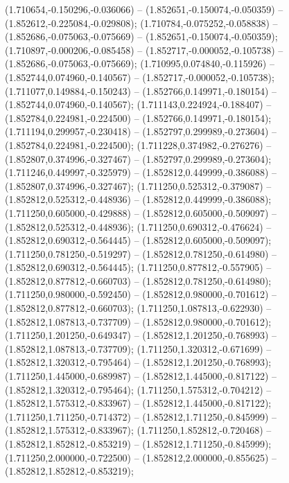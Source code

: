  (1.710654,-0.150296,-0.036066) -- (1.852651,-0.150074,-0.050359) -- (1.852612,-0.225084,-0.029808);
 (1.710784,-0.075252,-0.058838) -- (1.852686,-0.075063,-0.075669) -- (1.852651,-0.150074,-0.050359);
 (1.710897,-0.000206,-0.085458) -- (1.852717,-0.000052,-0.105738) -- (1.852686,-0.075063,-0.075669);
 (1.710995,0.074840,-0.115926) -- (1.852744,0.074960,-0.140567) -- (1.852717,-0.000052,-0.105738);
 (1.711077,0.149884,-0.150243) -- (1.852766,0.149971,-0.180154) -- (1.852744,0.074960,-0.140567);
 (1.711143,0.224924,-0.188407) -- (1.852784,0.224981,-0.224500) -- (1.852766,0.149971,-0.180154);
 (1.711194,0.299957,-0.230418) -- (1.852797,0.299989,-0.273604) -- (1.852784,0.224981,-0.224500);
 (1.711228,0.374982,-0.276276) -- (1.852807,0.374996,-0.327467) -- (1.852797,0.299989,-0.273604);
 (1.711246,0.449997,-0.325979) -- (1.852812,0.449999,-0.386088) -- (1.852807,0.374996,-0.327467);
 (1.711250,0.525312,-0.379087) -- (1.852812,0.525312,-0.448936) -- (1.852812,0.449999,-0.386088);
 (1.711250,0.605000,-0.429888) -- (1.852812,0.605000,-0.509097) -- (1.852812,0.525312,-0.448936);
 (1.711250,0.690312,-0.476624) -- (1.852812,0.690312,-0.564445) -- (1.852812,0.605000,-0.509097);
 (1.711250,0.781250,-0.519297) -- (1.852812,0.781250,-0.614980) -- (1.852812,0.690312,-0.564445);
 (1.711250,0.877812,-0.557905) -- (1.852812,0.877812,-0.660703) -- (1.852812,0.781250,-0.614980);
 (1.711250,0.980000,-0.592450) -- (1.852812,0.980000,-0.701612) -- (1.852812,0.877812,-0.660703);
 (1.711250,1.087813,-0.622930) -- (1.852812,1.087813,-0.737709) -- (1.852812,0.980000,-0.701612);
 (1.711250,1.201250,-0.649347) -- (1.852812,1.201250,-0.768993) -- (1.852812,1.087813,-0.737709);
 (1.711250,1.320312,-0.671699) -- (1.852812,1.320312,-0.795464) -- (1.852812,1.201250,-0.768993);
 (1.711250,1.445000,-0.689987) -- (1.852812,1.445000,-0.817122) -- (1.852812,1.320312,-0.795464);
 (1.711250,1.575312,-0.704212) -- (1.852812,1.575312,-0.833967) -- (1.852812,1.445000,-0.817122);
 (1.711250,1.711250,-0.714372) -- (1.852812,1.711250,-0.845999) -- (1.852812,1.575312,-0.833967);
 (1.711250,1.852812,-0.720468) -- (1.852812,1.852812,-0.853219) -- (1.852812,1.711250,-0.845999);
 (1.711250,2.000000,-0.722500) -- (1.852812,2.000000,-0.855625) -- (1.852812,1.852812,-0.853219);
